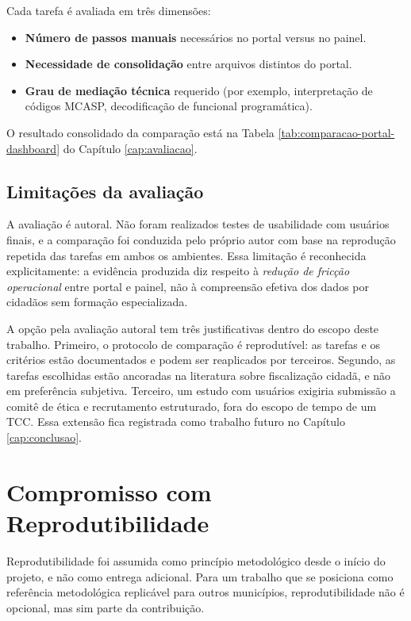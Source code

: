 Cada tarefa é avaliada em três dimensões:

\begin{itemize}
    \item \textbf{Número de passos manuais} necessários no portal versus
    no painel.
    \item \textbf{Necessidade de consolidação} entre arquivos distintos
    do portal.
    \item \textbf{Grau de mediação técnica} requerido (por exemplo,
    interpretação de códigos MCASP, decodificação de funcional
    programática).
\end{itemize}

O resultado consolidado da comparação está na Tabela
\ref{tab:comparacao-portal-dashboard} do Capítulo \ref{cap:avaliacao}.

\subsection*{Limitações da avaliação}

A avaliação é autoral. Não foram realizados testes de usabilidade com
usuários finais, e a comparação foi conduzida pelo próprio autor com
base na reprodução repetida das tarefas em ambos os ambientes. Essa
limitação é reconhecida explicitamente: a evidência produzida diz
respeito à \emph{redução de fricção operacional} entre portal e painel,
não à compreensão efetiva dos dados por cidadãos sem formação
especializada.

A opção pela avaliação autoral tem três justificativas dentro do escopo
deste trabalho. Primeiro, o protocolo de comparação é reprodutível: as
tarefas e os critérios estão documentados e podem ser reaplicados por
terceiros. Segundo, as tarefas escolhidas estão ancoradas na literatura
sobre fiscalização cidadã, e não em preferência subjetiva. Terceiro,
um estudo com usuários exigiria submissão a comitê de ética e
recrutamento estruturado, fora do escopo de tempo de um TCC. Essa
extensão fica registrada como trabalho futuro no Capítulo
\ref{cap:conclusao}.

\section{Compromisso com Reprodutibilidade}
\label{sec:reprodutibilidade}

Reprodutibilidade foi assumida como princípio metodológico desde o início do projeto, e não como entrega adicional. Para um trabalho que se posiciona como referência metodológica replicável para outros municípios, reprodutibilidade não é opcional, mas sim parte da contribuição.


